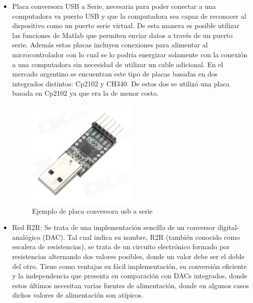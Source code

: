 \begin{itemize}
\item Placa conversora USB a Serie, necesaria para poder conectar a una computadora va puerto USB y que la computadora sea capaz de reconocer al dispositivo como un puerto serie virtual. De esta manera es posible utilizar las funciones de Matlab que permiten enviar datos a través de un puerto serie. Además estas placas incluyen conexiones para alimentar al microcontrolador con lo cual se lo podría energizar solamente con la conexión a una computadora sin necesidad de utilizar un cable adicional. En el mercado argentino se encuentran este tipo de placas basadas en dos integrados distintos: Cp2102 y CH340. De estos dos se utilizó una placa basada en Cp2102 ya que era la de menor costo.

\begin{figure}[H]
  \centering
  \includegraphics[width=0.5\textwidth]{images/conversor_usbttl.png}
  \caption{Ejemplo de placa conversora usb a serie}
  \label{fig:usbattl}
\end{figure}


\item Red R2R: Se trata de una implementación sencilla de un conversor digital-analógico (DAC). Tal cual indica su nombre, R2R (también conocido como escalera de resistencias), se trata de un circuito electrónico formado por resistencias alternando dos valores posibles, donde un valor debe ser el doble del otro. Tiene como ventajas su fácil implementación, su conversión eficiente y la independencia que presenta en comparación con DACs integrados, donde estos últimos necesitan varias fuentes de alimentación, donde en algunos casos dichos valores de alimentación son atípicos.


\end{itemize}
